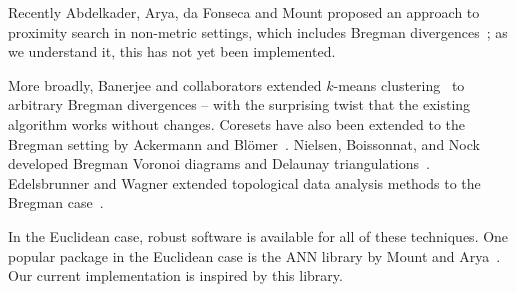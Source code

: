     Recently Abdelkader, Arya, da Fonseca and Mount proposed an approach to proximity search in non-metric settings, which includes Bregman divergences~\cite{abdelkader2019approximate}; as we understand it, this has not yet been implemented.
\fi

More broadly, Banerjee and collaborators extended $k$-means clustering~\cite{JMLR:v6:banerjee05b} to arbitrary Bregman divergences -- with the surprising twist that the existing algorithm works without changes. Coresets have also been extended to the Bregman setting by Ackermann and Bl{\"o}mer~\cite{Ackermann_Blomer_k_median}. Nielsen, Boissonnat, and Nock developed Bregman Voronoi diagrams and Delaunay triangulations~\cite{Bregman_Voronoi}. Edelsbrunner and Wagner extended topological data analysis methods to the Bregman case~\cite{EdWa16}. 


In the Euclidean case, robust software is available for all of these techniques.
One popular package in the Euclidean case is the ANN library by Mount and Arya~\cite{ANN_kd, ANN_Manual, ANN_boundary, ANN_optimalAlgorithm}. Our current implementation is inspired by this library. %